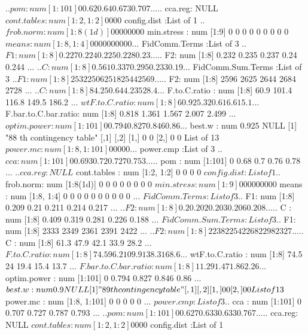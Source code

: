 \documentclass[11pt]{article} %
\begin{document}
\begin{Schunk}
\begin{Soutput}
  ..$ pom    : num [1:101] 0 0.62 0.64 0.673 0.707 ...
  ..$ cca.reg: NULL
 $ cont.tables         : num [1:2, 1:2] 0 0 0 0
 $ config.dist         :List of 1
  ..$ frob.norm: num [1:8(1d)] 0 0 0 0 0 0 0 0
 $ min.stress          : num [1:9] 0 0 0 0 0 0 0 0 0
 $ means               : num [1:8, 1:4] 0 0 0 0 0 0 0 0 0 0 ...
 $ FidComm.Terms       :List of 3
  ..$ F1: num [1:8] 0.227 0.224 0.225 0.228 0.23 ...
  ..$ F2: num [1:8] 0.232 0.235 0.237 0.24 0.244 ...
  ..$ C : num [1:8] 0.561 0.337 0.295 0.233 0.19 ...
 $ FidComm.Sum.Terms   :List of 3
  ..$ F1: num [1:8] 2532 2506 2518 2544 2569 ...
  ..$ F2: num [1:8] 2596 2625 2644 2684 2728 ...
  ..$ C : num [1:8] 84.2 50.6 44.2 35 28.4 ...
 $ F.to.C.ratio        : num [1:8] 60.9 101.4 116.8 149.5 186.2 ...
 $ wtF.to.C.ratio      : num [1:8] 60.9 25.3 20.6 16.6 15.1 ...
 $ F.bar.to.C.bar.ratio: num [1:8] 0.818 1.361 1.567 2.007 2.499 ...
 $ optim.power         : num [1:101] 0 0.794 0.827 0.846 0.86 ...
 $ best.w              : num 0.925
NULL
[1] "88 th contingency table"
     [,1] [,2]
[1,]    0    0
[2,]    0    0
List of 13
 $ power.mc            : num [1:8, 1:101] 0 0 0 0 0 ...
 $ power.cmp           :List of 3
  ..$ cca    : num [1:101] 0 0.693 0.72 0.727 0.753 ...
  ..$ pom    : num [1:101] 0 0.68 0.7 0.76 0.78 ...
  ..$ cca.reg: NULL
 $ cont.tables         : num [1:2, 1:2] 0 0 0 0
 $ config.dist         :List of 1
  ..$ frob.norm: num [1:8(1d)] 0 0 0 0 0 0 0 0
 $ min.stress          : num [1:9] 0 0 0 0 0 0 0 0 0
 $ means               : num [1:8, 1:4] 0 0 0 0 0 0 0 0 0 0 ...
 $ FidComm.Terms       :List of 3
  ..$ F1: num [1:8] 0.209 0.21 0.211 0.214 0.217 ...
  ..$ F2: num [1:8] 0.2 0.202 0.203 0.206 0.208 ...
  ..$ C : num [1:8] 0.409 0.319 0.281 0.226 0.188 ...
 $ FidComm.Sum.Terms   :List of 3
  ..$ F1: num [1:8] 2333 2349 2361 2391 2422 ...
  ..$ F2: num [1:8] 2238 2254 2268 2298 2327 ...
  ..$ C : num [1:8] 61.3 47.9 42.1 33.9 28.2 ...
 $ F.to.C.ratio        : num [1:8] 74.5 96.2 109.9 138.3 168.6 ...
 $ wtF.to.C.ratio      : num [1:8] 74.5 24 19.4 15.4 13.7 ...
 $ F.bar.to.C.bar.ratio: num [1:8] 1 1.29 1.47 1.86 2.26 ...
 $ optim.power         : num [1:101] 0 0.794 0.827 0.846 0.86 ...
 $ best.w              : num 0.9
NULL
[1] "89 th contingency table"
     [,1] [,2]
[1,]    0    0
[2,]    0    0
List of 13
 $ power.mc            : num [1:8, 1:101] 0 0 0 0 0 ...
 $ power.cmp           :List of 3
  ..$ cca    : num [1:101] 0 0.707 0.727 0.787 0.793 ...
  ..$ pom    : num [1:101] 0 0.627 0.633 0.633 0.767 ...
  ..$ cca.reg: NULL
 $ cont.tables         : num [1:2, 1:2] 0 0 0 0
 $ config.dist         :List of 1

\end{Soutput}
\end{Schunk}
\end{document}

